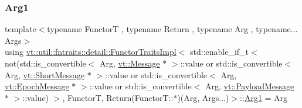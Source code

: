 \subsubsection{\texorpdfstring{Arg1}{Arg1}}
{\footnotesize\ttfamily template$<$typename FunctorT , typename Return , typename Arg , typename... Args$>$ \\
using \hyperlink{structvt_1_1util_1_1fntraits_1_1detail_1_1_functor_traits_impl}{vt\+::util\+::fntraits\+::detail\+::\+Functor\+Traits\+Impl}$<$ std\+::enable\+\_\+if\+\_\+t$<$ not(std\+::is\+\_\+convertible$<$ Arg, \hyperlink{namespacevt_a3a3ddfef40b4c90915fa43cdd5f129ea}{vt\+::\+Message} $\ast$ $>$\+::value or std\+::is\+\_\+convertible$<$ Arg, \hyperlink{namespacevt_a1125ac1da6c0bbf141e0ea0739d7602d}{vt\+::\+Short\+Message} $\ast$ $>$\+::value or std\+::is\+\_\+convertible$<$ Arg, \hyperlink{namespacevt_ad67368ffae52d7325002586b41bb150e}{vt\+::\+Epoch\+Message} $\ast$ $>$\+::value or std\+::is\+\_\+convertible$<$ Arg, \hyperlink{namespacevt_a89a92229c5622b855c02c549f83a1a68}{vt\+::\+Payload\+Message} $\ast$ $>$\+::value) $>$, FunctorT, Return(Functor\+T\+::$\ast$)(Arg, Args...)$>$\+::\hyperlink{structvt_1_1util_1_1fntraits_1_1detail_1_1_functor_traits_impl_3_01std_1_1enable__if__t_3_01not_ff7bf429a58012799da4cee5038d568d_a371f7495a64a266199bcb42758bb2e52}{Arg1} =  Arg}

